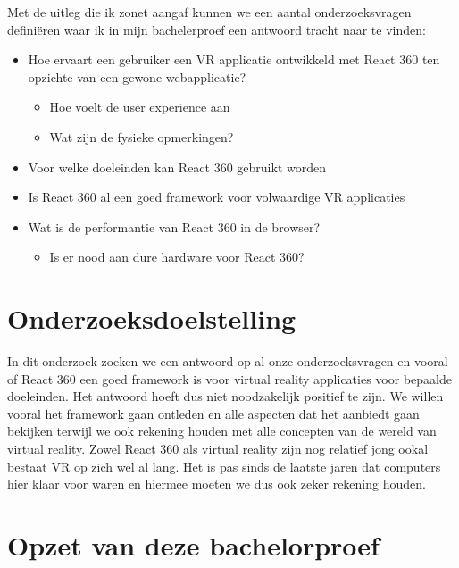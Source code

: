 Met de uitleg die ik zonet aangaf kunnen we een aantal onderzoeksvragen definiëren waar ik in mijn bachelerproef een antwoord tracht naar te vinden:
\begin{itemize}
  \item	Hoe ervaart een gebruiker een VR applicatie ontwikkeld met React 360 ten opzichte van een gewone webapplicatie?
  \begin{itemize}
  \item	Hoe voelt de user experience aan
  \item	Wat zijn de fysieke opmerkingen?
  \end{itemize}
  \item	Voor welke doeleinden kan React 360 gebruikt worden
  \item	Is React 360 al een goed framework voor volwaardige VR applicaties
  \item	Wat is de performantie van React 360 in de browser?
  \begin{itemize}
  \item Is er nood aan dure hardware voor React 360?
  \end{itemize}
\end{itemize}



\section{Onderzoeksdoelstelling}
\label{sec:onderzoeksdoelstelling}

In dit onderzoek zoeken we een antwoord op al onze onderzoeksvragen en vooral of React 360 een goed framework is voor virtual reality applicaties voor bepaalde doeleinden. Het antwoord hoeft dus niet noodzakelijk positief te zijn. We willen vooral het framework gaan ontleden en alle aspecten dat het aanbiedt gaan bekijken terwijl we ook rekening houden met alle concepten van de wereld van virtual reality. Zowel React 360 als virtual reality zijn nog relatief jong ookal bestaat VR op zich wel al lang. Het is pas sinds de laatste jaren dat computers hier klaar voor waren en hiermee moeten we dus ook zeker rekening houden.

\section{Opzet van deze bachelorproef}
\label{sec:opzet-bachelorproef}


